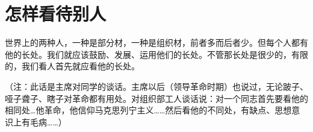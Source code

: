 \section[怎样看待别人]{怎样看待别人}


世界上的两种人，一种是部分材，一种是组织材，前者多而后者少。但每个人都有他的长处。我们就应该鼓励、发展、运用他们的长处。不管那长处是很少的，有限的，我们看人首先就应看他的长处。

（注：此话是主席对同学的谈话。主席以后（领导革命时期）也说过，无论跛子、哑子聋子、瞎子对革命都有用处。对组织部工人谈话说：对一个同志首先要看他的相同处…他革命，他信仰马克思列宁主义……然后看他的不同处，有缺点、思想意识上有毛病……）

